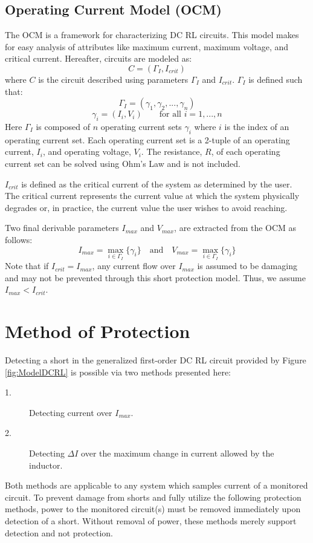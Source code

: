 \documentclass[11pt,compsoc,oneside]{report}
\begin{document}
\section{Operating Current Model (OCM)}
The OCM is a framework for characterizing DC RL circuits. This model makes for easy analysis of attributes like maximum current, maximum voltage, and critical current. Hereafter, circuits are modeled as:
\begin{equation}\label{eq:OCM}
C = (\Gamma_{I}, I_{crit})
\end{equation}
where $C$ is the circuit described using parameters $\Gamma_{I}$ and $I_{crit}$. $\Gamma_{I}$ is defined such that:
\begin{equation}\label{eq:OCMTuples}
\Gamma_{I} = (\gamma_{1},\gamma_{2},...,\gamma_{n})
\end{equation}
\begin{equation}\label{eq:OCMIVPairs}
\gamma_{i} = (I_{i},V_{i})\qquad\text{for all  } i=1,...,n
\end{equation}
Here $\Gamma_{I}$ is composed of $n$ operating current sets $\gamma_{i}$ where $i$ is the index of an operating current set. Each operating current set is a 2-tuple of an operating current, $I_{i}$, and operating voltage, $V_{i}$. The resistance, $R$, of each operating current set can be solved using Ohm's Law and is not included. 

$I_{crit}$ is defined as the critical current of the system as determined by the user. The critical current represents the current value at which the system physically degrades or, in practice, the current value the user wishes to avoid reaching.

Two final derivable parameters $I_{max}$ and $V_{max}$, are extracted from the OCM as follows:
\begin{equation}\label{eq:Imax}
I_{max} = \max_{i \in \Gamma_{I}} \{\gamma_i\} \quad \text{and} \quad V_{max} = \max_{i \in \Gamma_{I}} \{\gamma_i\}
\end{equation}
Note that if $I_{crit} = I_{max}$, any current flow over $I_{max}$ is assumed to be damaging and may not be prevented through this short protection model. Thus, we assume $I_{max} < I_{crit}$.
\chapter{Method of Protection}\label{chap:method of protection}
Detecting a short in the generalized first-order DC RL circuit provided by Figure \ref{fig:ModelDCRL} is possible via two methods presented here:
\begin{description}
\item [1.] Detecting current over $I_{max}$.
\item [2.] Detecting $\Delta I$ over the maximum change in current allowed by the inductor.
\end{description}
Both methods are applicable to any system which samples current of a monitored circuit. To prevent damage from shorts and fully utilize the following protection methods, power to the monitored circuit(s) must be removed immediately upon detection of a short. Without removal of power, these methods merely support detection and not protection.
\end{document}
